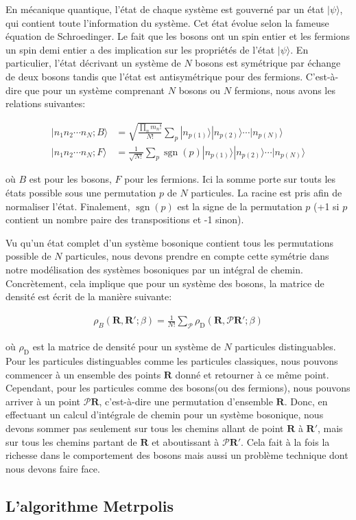 \documentclass[11pt]{article}
\theoremstyle{definition}
\theoremstyle{remark}
\begin{document}
En mécanique quantique, l'état de chaque système est gouverné par un état $|\psi \rangle$, qui contient toute l'information du système. Cet état évolue selon la fameuse équation de Schroedinger. Le fait que les bosons ont un spin entier et les fermions un spin demi entier a des implication sur les propriétés de l'état $| \psi \rangle$. En particulier, l’état décrivant un système de $N$ bosons est symétrique par échange de deux bosons tandis que l'état est antisymétrique pour des fermions. C'est-à-dire que pour un système comprenant $N$ bosons ou $N$ fermions, nous avons les relations suivantes: 

\begin{align} 
\label{symetrie_boson_fermion}
|n_1 n_2 \cdots n_N; B\rangle &= \sqrt{\frac{\prod_n m_n!}{N!}} \sum_p |n_{p(1)}\rangle |n_{p(2)}\rangle \cdots |n_{p(N)}\rangle \\
|n_1 n_2 \cdots n_N; F\rangle &= \frac{1}{\sqrt{N!}} \sum_p \operatorname{sgn}(p) |n_{p(1)}\rangle |n_{p(2)}\rangle \cdots |n_{p(N)}\rangle
\end{align}

où $B$ est pour les bosons, $F$ pour les fermions. Ici la somme porte sur touts les états possible sous une permutation $p$ de $N$ particules. La racine est pris afin de normaliser l'état. Finalement, $\operatorname{sgn}(p)$ est la signe de la permutation $p$ (+1 si $p$ contient un nombre paire des transpositions et -1 sinon). 

Vu qu'un état complet d'un système bosonique contient tous les permutations possible de $N$ particules, nous devons prendre en compte cette symétrie dans notre modélisation des systèmes bosoniques par un intégral de chemin. Concrètement, cela implique que pour un système des bosons, la matrice de densité est écrit de la manière suivante: 

\begin{align} 
\label{densite_boson}
\rho_{B}( \mathbf{R}, \mathbf{R}'; \beta) = \frac{1}{N!}\sum_{\mathcal{P}} \rho_{\mathrm{D}} (\mathbf{R}, \mathcal{P} \mathbf{R}'; \beta)
\end{align}

où $\rho_{\mathrm{D}}$ est la matrice de densité pour un système de $N$ particules distinguables. Pour les particules distinguables comme les particules classiques, nous pouvons commencer à un ensemble des points $\mathbf{R}$ donné et retourner à ce même point. Cependant, pour les particules comme des bosons(ou des fermions), nous pouvons arriver à un point $\mathcal{P}\mathbf{R}$, c'est-à-dire une permutation d'ensemble $\mathbf{R}$. Donc, en effectuant un calcul d’intégrale de chemin pour un système bosonique, nous devons sommer pas seulement sur tous les chemins allant de point $\mathbf{R}$ à $\mathbf{R}'$, mais sur tous les chemins partant de $\mathbf{R}$ et aboutissant à $\mathcal{P}\mathbf{R}'$. Cela fait à la fois la richesse dans le comportement des bosons mais aussi un problème technique dont nous devons faire face. 

\subsection{L'algorithme Metrpolis}
\end{document}
